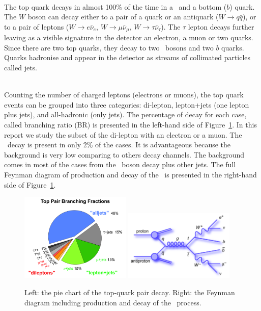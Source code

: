 \ \\The top quark decays in almost 100\% of the time in a \Wboson~and a bottom ($b$) quark. The $W$ boson can decay either to a pair of a quark or an antiquark ($W\rightarrow q\bar{q}$), or to a pair of leptons ($W \rightarrow e\bar{\nu}_e$, $W \rightarrow \mu\bar{\nu}_\mu$, $W \rightarrow \tau\bar{\nu}_\tau$). The $\tau$ lepton decays further leaving as a visible signature in the detector an electron, a muon or two quarks. Since there are two top quarks, they decay to two \Wboson~bosons and two $b$ quarks. Quarks hadronise and appear in the detector as streams of collimated particles called jets. 

\ \\Counting the number of charged leptons (electrons or muons), the top quark events can be grouped into three categories: di-lepton, lepton+jets (one lepton plus jets), and all-hadronic (only jets). The percentage of decay for each case, called branching ratio (BR) is presented in the left-hand side of Figure~\ref{fig:TopQuarkDecay}. In this report we study the subset of the di-lepton with an electron or a muon. The \ttbaremu~decay is present in only 2\% of the cases. It is advantageous because the background is very low comparing to others decay channels. The background comes in most of the cases from the \Zboson~boson decay plus other jets. The full Feynman diagram of production and decay of the \ttbaremu~is presented in the right-hand side of Figure~\ref{fig:TopQuarkDecay}.

\begin{figure}[h]
  \centering
  \includegraphics[width=0.47\textwidth]{../presentation/plots/ttbar_5.png}
  \includegraphics[width=0.47\textwidth]{../presentation/plots/ttbar_4.png}
  \caption{Left: the pie chart of the top-quark pair decay. Right: the Feynman diagram including production and decay of the \ttbaremu~process.}
  \label{fig:TopQuarkDecay}
\end{figure}

